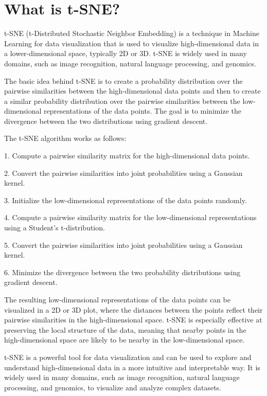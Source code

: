 \section{What is t-SNE?}
t-SNE (t-Distributed Stochastic Neighbor Embedding) is a technique in Machine Learning for data visualization that is used to visualize high-dimensional data in a lower-dimensional space, typically 2D or 3D. t-SNE is widely used in many domains, such as image recognition, natural language processing, and genomics.

The basic idea behind t-SNE is to create a probability distribution over the pairwise similarities between the high-dimensional data points and then to create a similar probability distribution over the pairwise similarities between the low-dimensional representations of the data points. The goal is to minimize the divergence between the two distributions using gradient descent.

The t-SNE algorithm works as follows:

1. Compute a pairwise similarity matrix for the high-dimensional data points.

2. Convert the pairwise similarities into joint probabilities using a Gaussian kernel.

3. Initialize the low-dimensional representations of the data points randomly.

4. Compute a pairwise similarity matrix for the low-dimensional representations using a Student's t-distribution.

5. Convert the pairwise similarities into joint probabilities using a Gaussian kernel.

6. Minimize the divergence between the two probability distributions using gradient descent.

The resulting low-dimensional representations of the data points can be visualized in a 2D or 3D plot, where the distances between the points reflect their pairwise similarities in the high-dimensional space. t-SNE is especially effective at preserving the local structure of the data, meaning that nearby points in the high-dimensional space are likely to be nearby in the low-dimensional space.

t-SNE is a powerful tool for data visualization and can be used to explore and understand high-dimensional data in a more intuitive and interpretable way. It is widely used in many domains, such as image recognition, natural language processing, and genomics, to visualize and analyze complex datasets.

